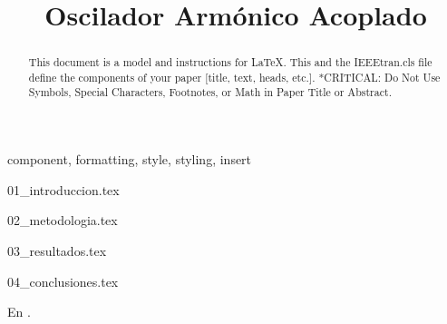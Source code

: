 \documentclass[conference]{IEEEtran}
\begin{document}
\title{Oscilador Armónico Acoplado}

\author{
}
	
\maketitle
	
\begin{abstract}
	This document is a model and instructions for \LaTeX.
	This and the IEEEtran.cls file define the components of your paper [title, text, heads, etc.]. *CRITICAL: Do Not Use Symbols, Special Characters, Footnotes, 
	or Math in Paper Title or Abstract.
\end{abstract}
	
\begin{IEEEkeywords}
	component, formatting, style, styling, insert
\end{IEEEkeywords}
	
{01_introduccion.tex}
	
{02_metodologia.tex}
	
{03_resultados.tex}
	
{04_conclusiones.tex}
	
	
En \cite{al2017parallel}.

	
\renewcommand{\refname}{Referencias}


	
\end{document}
